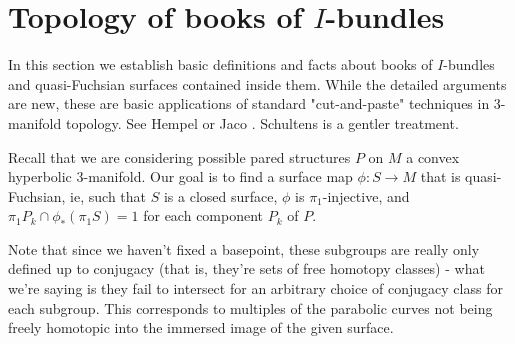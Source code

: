 \section{Topology of books of $I$-bundles}

In this section we establish basic definitions and facts about books of
$I$-bundles and quasi-Fuchsian surfaces contained inside them. While the
detailed arguments are new, these are basic applications of standard
"cut-and-paste" techniques in 3-manifold topology. See Hempel \cite{He} or Jaco
\cite{Ja}. Schultens \cite{Sch} is a gentler treatment.

Recall that we are considering possible pared structures $P$ on $M$ a convex
hyperbolic 3-manifold. Our goal is to find a surface map $\phi \colon S \to M$
that is quasi-Fuchsian, ie, such that $S$ is a closed surface, $\phi$ is
$\pi_1$-injective, and $\pi_1P_k \cap \phi_*(\pi_1S) = 1$ for each component
$P_k$ of $P$.

Note that since we haven't fixed a basepoint, these subgroups are really only
defined up to conjugacy (that is, they're sets of free homotopy classes) - what
we're saying is they fail to intersect for an arbitrary choice of conjugacy
class for each subgroup. This corresponds to multiples of the parabolic curves
not being freely homotopic into the immersed image of the given surface.

